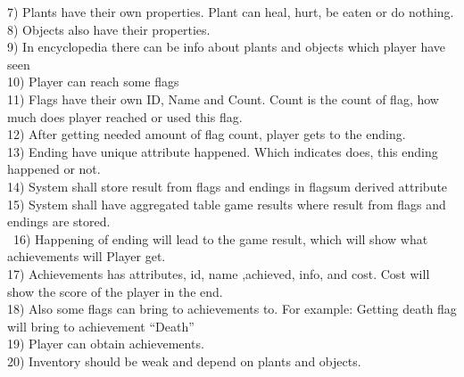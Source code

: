 \documentclass[12pt,a4paper]{article}
\begin{document}
7) Plants have their own properties. Plant can heal, hurt, be eaten or do nothing.\\
8) Objects also have their properties. \\
9) In encyclopedia there can be info about plants and objects which player have seen\\
10) Player can reach some flags\\
11) Flags have their own ID, Name and Count. Count is the count of flag, how much does player reached or used this flag.\\
12) After getting needed amount of flag count, player gets to the ending.\\
13) Ending have unique attribute happened. Which indicates does, this ending happened or not.\\
14) System shall store result from flags and endings in flagsum derived attribute \\15) System shall have aggregated table game results where result from flags and endings are stored.\\
\
16) Happening of ending will lead to the game result, which will show what achievements will Player get.\\ 
17) Achievements has attributes, id, name ,achieved, info, and cost. Cost will show the score of the player in the end.\\
18) Also some flags can bring to achievements to. For example: Getting death flag will bring to achievement “Death”\\
19) Player can obtain achievements.\\  
20) Inventory should be weak and depend on plants and objects.\\  

\newpage
\end{document}
